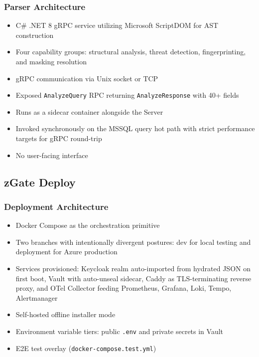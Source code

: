 \subsubsection{Parser Architecture}
\begin{itemize}
    \item C\# .NET 8 gRPC service utilizing Microsoft ScriptDOM for AST construction
    \item Four capability groups: structural analysis, threat detection, fingerprinting, and masking resolution
    \item gRPC communication via Unix socket or TCP
    \item Exposed \texttt{AnalyzeQuery} RPC returning \texttt{AnalyzeResponse} with 40+ fields
    \item Runs as a sidecar container alongside the Server
    \item Invoked synchronously on the MSSQL query hot path with strict performance targets for gRPC round-trip
    \item No user-facing interface
\end{itemize}

\subsection{zGate Deploy}

\subsubsection{Deployment Architecture}
\begin{itemize}
    \item Docker Compose as the orchestration primitive
    \item Two branches with intentionally divergent postures: dev for local testing and deployment for Azure production
    \item Services provisioned: Keycloak realm auto-imported from hydrated JSON on first boot, Vault with auto-unseal sidecar, Caddy as TLS-terminating reverse proxy, and OTel Collector feeding Prometheus, Grafana, Loki, Tempo, Alertmanager
    \item Self-hosted offline installer mode
    \item Environment variable tiers: public \texttt{.env} and private secrets in Vault
    \item E2E test overlay (\texttt{docker-compose.test.yml})
\end{itemize}

